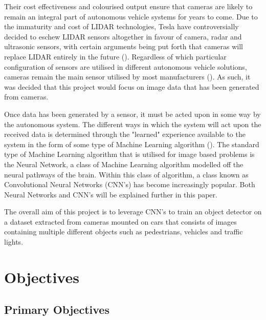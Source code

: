 \documentclass[12pt]{report}
\begin{document}
\begin{flushleft}
\vspace{0.5cm}
Their cost effectiveness and colourised output ensure that cameras are likely to remain an integral part of autonomous vehicle systems for years to come. Due to the immaturity and cost of LIDAR technologies, Tesla have controversially decided to eschew LIDAR sensors altogether in favour of camera, radar and ultrasonic sensors, with certain arguments being put forth that cameras will replace LIDAR entirely in the future (\cite{harris2015cheaper}). Regardless of which particular configuration of sensors are utilised in different autonomous vehicle solutions, cameras remain the main sensor utilised by most manufacturers (\cite{kocic2018sensors}). As such, it was decided that this project would focus on image data that has been generated from cameras.
\end{flushleft}

\vspace{0.5cm}
\begin{flushleft}
Once data has been generated by a sensor, it must be acted upon in some way by the autonomous system. The different ways in which the system will act upon the received data is determined through the "learned" experience available to the system in the form of some type of Machine Learning algorithm (\cite{surden2016technological}). The standard type of Machine Learning algorithm that is utilised for image based problems is the Neural Network, a class of Machine Learning algorithm modelled off the neural pathways of the brain. Within this class of algorithm, a class known as Convolutional Neural Networks (CNN's) has become increasingly popular. Both Neural Networks and CNN's will be explained further in this paper.
\end{flushleft}

\vspace{0.5cm}
\begin{flushleft}
The overall aim of this project is to leverage CNN's to train an object detector on a dataset extracted from cameras mounted on cars that consists of images containing multiple different objects such as pedestrians, vehicles and traffic lights.
\end{flushleft}

\section{Objectives}
\vspace{0.5cm}
\subsection{Primary Objectives}
\end{document}
